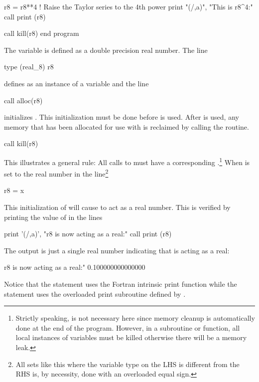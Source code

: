 \documentclass{hitec}     %
\begin{document}
{{{{\begin{code}
r8 = r8**4  ! Raise the Taylor series to the 4th power
print "(/,a)", "This is r8^4:"
call print (r8)

call kill(r8)
end program
\end{code}
The variable  is defined as a double precision real number. The line
\begin{code}
type (real_8) r8
\end{code}
defines  as an instance of a  variable and the line
\begin{code}
call alloc(r8)
\end{code}
initializes . This initialization must be done before  is used. After  is used,
any memory that has been allocated for use with  is reclaimed by calling the 
routine.
\begin{code}
call kill(r8)
\end{code}
This illustrates a general rule: All calls to  must have a corresponding .\footnote
  { 
Strictly speaking,  is not necessary here since memory cleanup is automatically done at the end
of the program. However, in a subroutine or function, all local instances of  variables
must be killed otherwise there will be a memory leak.
  }
When  is set to the real number  in the line\footnote
  {
All sets like this where the variable type on the LHS is different from the RHS is, by necessity, done
with an overloaded equal sign.
  }
\begin{code}
  r8 = x
\end{code}
This initialization of 
will cause  to act as a real number. This is verified by printing the value of  in the lines
\begin{code}
print '(/,a)', "r8 is now acting as a real:"
call print (r8)
\end{code}
The output is just a single real number indicating that  is acting as a real:
\begin{code}
r8 is now acting as a real:"
0.100000000000000
\end{code}
Notice that the  statement uses the Fortran intrinsic print function while the  statement uses the overloaded print subroutine defined by .

}}}}
\end{document}
